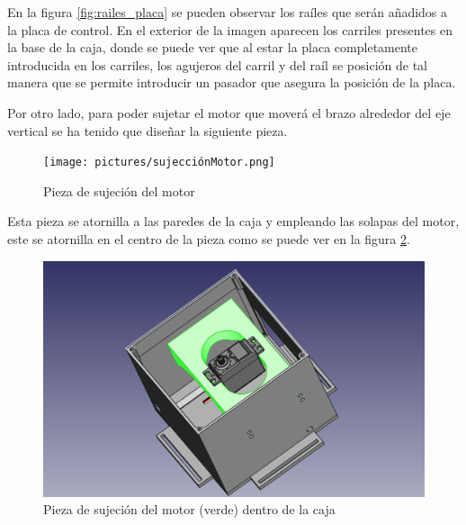 En la figura \ref{fig:railes_placa} se pueden observar los raíles que serán añadidos a la placa de control. En el exterior de la imagen aparecen los carriles presentes en la base de la caja, donde se puede ver que al estar la placa completamente introducida en los carriles, los agujeros del carril y del raíl se posición de tal manera que se permite introducir un pasador que asegura la posición de la placa.

Por otro lado, para poder sujetar el motor que moverá el brazo alrededor del eje vertical se ha tenido que diseñar la siguiente pieza.

 \begin{figure}[H]
    \centering
    \texttt{[image: pictures/sujecciónMotor.png]}
    \caption{Pieza de sujeción del motor}
    \label{fig:sujecion_motor}
\end{figure}

Esta pieza se atornilla a las paredes de la caja y empleando las solapas del motor, este se atornilla en el centro de la pieza como se puede ver en la figura \ref{fig:pieza_sujecio_en_caja}.

 \begin{figure}[H]
    \centering
    \includegraphics[width=.9\linewidth]{pictures/cajaConMotor.png}
    \caption{Pieza de sujeción del motor (verde) dentro de la caja}
    \label{fig:pieza_sujecio_en_caja}
\end{figure}